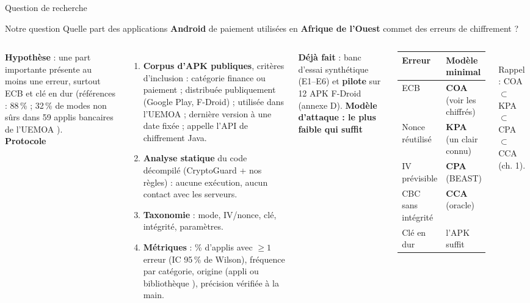 \documentclass[aspectratio=169,10pt]{beamer}
\begin{document}
\begin{frame}{Question de recherche}
  \begin{block}{Notre question}
    Quelle part des applications \textbf{Android} de paiement utilisées en \textbf{Afrique de l'Ouest}
    commet des erreurs de chiffrement ?
  \end{block}
  \vspace{0.1em}
  \begin{columns}[T]
    \scriptsize
    \textbf{Hypothèse} : une part importante présente au moins une erreur, surtout ECB et clé en dur
    (références : 88\,\% \cite{egele2013} ; 32\,\% de modes non sûrs dans 59 applis bancaires de l'UEMOA \cite{diallo2024}).\\[0.3em]
    \textbf{Protocole}
    \begin{enumerate}
      \item \textbf{Corpus d'APK publiques}, critères d'inclusion : catégorie finance ou paiement ;
            distribuée publiquement (Google Play, F-Droid) ; utilisée dans l'UEMOA ; dernière version à une date fixée ;
            appelle l'API de chiffrement Java.
      \item \textbf{Analyse statique} du code décompilé (CryptoGuard \cite{rahaman2019} + nos règles) :
            aucune exécution, aucun contact avec les serveurs.
      \item \textbf{Taxonomie} : mode, IV/nonce, clé, intégrité, paramètres.
      \item \textbf{Métriques} : \% d'applis avec $\geq 1$ erreur (IC 95\,\% de Wilson), fréquence par catégorie,
            origine (appli ou bibliothèque \cite{muslukhov2018}), précision vérifiée à la main.
    \end{enumerate}
    \textbf{Déjà fait} : banc d'essai synthétique (E1--E6) et \textbf{pilote} sur 12 APK F-Droid (annexe D).
    \scriptsize\textbf{Modèle d'attaque : le plus faible qui suffit}\\[0.2em]
    \begin{tabular}{ll}
      \toprule
      Erreur & Modèle minimal \\
      \midrule
      ECB & \textbf{COA} (voir les chiffrés) \\
      Nonce réutilisé & \textbf{KPA} (un clair connu) \\
      IV prévisible & \textbf{CPA} (BEAST) \\
      CBC sans intégrité & \textbf{CCA} (oracle) \\
      Clé en dur & l'APK suffit \\
      \bottomrule
    \end{tabular}\\[0.2em]
    \tiny Rappel : COA $\subset$ KPA $\subset$ CPA $\subset$ CCA (ch. 1).
  \end{columns}
\end{frame}
\end{document}
